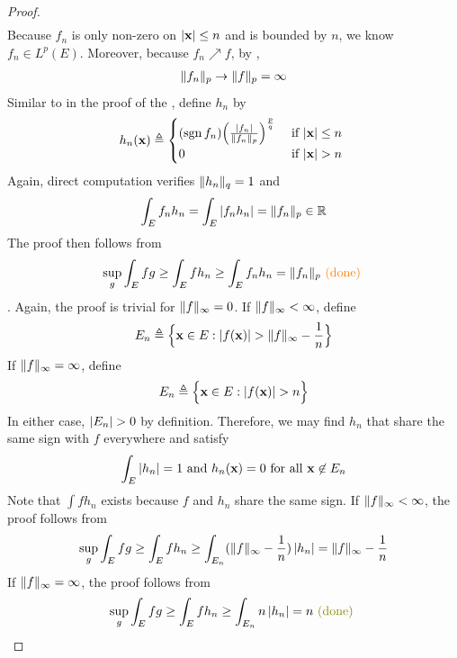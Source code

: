 \documentclass{report}
\begin{document}
\begin{proof}
\begin{align*}
\end{align*}
Because $f_n$ is only non-zero on $\left|\textbf{x}\right|\leq n$ and is bounded by  $n$, we know $f_n \in L^p(E)$. Moreover, because $f_n\nearrow f$, by , 
\begin{align*}
\| f_n \|_p \to \| f \|_p = \infty
\end{align*}
Similar to  in the proof of the , define $h_n$ by 
\begin{align*}
h_n(\textbf{x})\triangleq \begin{cases}
  (\operatorname{sgn}f_n) \Big( \frac{\abso{f_n}}{\norm{f_n}_p} \Big) ^{ \frac{p}{q}}& \text{ if $\abso{\textbf{x}}\leq n$ }\\
  0& \text{ if $\abso{\textbf{x}}>n$ }
\end{cases} 
\end{align*}
Again, direct computation verifies $\| h_n \|_q=1$ and  
 \begin{align*}
   \int_E f_nh_n = \int_E \left|f_nh_n\right|= \| f_n \|_p \in\mathbb{R}
\end{align*}
The proof then follows from 
\begin{align*}
\sup_g \int_E fg\geq \int_E fh_n \geq \int_E f_nh_n = \| f_n \|_p \textcolor{orange}{\text{ (done) }} 
\end{align*}
. Again, the proof is trivial for $\| f \|_{\infty}=0$. If $\| f \|_{\infty}<\infty$, define 
\begin{align*}
E_n \triangleq \bset{\textbf{x}\in E: \abso{f(\textbf{x})}> \norm{f}_\infty - \frac{1}{n}}
\end{align*}
If $\| f \|_{\infty}=\infty$, define 
\begin{align*}
E_n \triangleq \bset{\textbf{x} \in E: \abso{f(\textbf{x})}> n}
\end{align*}
In either case, $\abso{E_n}>0$ by definition. Therefore, we may find $h_n$ that share the same sign with $f$ everywhere and satisfy   
\begin{align*}
\int_{E}\left|h_n\right|=1\text{ and }h_n(\textbf{x})=0\text{ for all }\textbf{x}\not\in E_n
\end{align*}
Note that  $\int fh_n$  exists because $f$ and  $h_n$ share the same sign. If $\| f \|_{\infty}<\infty$, the proof follows from 
\begin{align*}
\sup_g \int_E fg\geq \int_E fh_n \geq \int_{E_n} (\| f \|_{\infty}- \frac{1}{n}) \left|h_n\right|= \| f \|_{\infty} - \frac{1}{n} 
\end{align*}
If $\| f \|_{\infty}=\infty$, the proof follows from 
\begin{align*}
\sup_g \int_E fg \geq \int_E fh_n \geq \int_{E_n} n \abso{h_n}= n \odone
\end{align*}

\end{proof}
\end{document}
